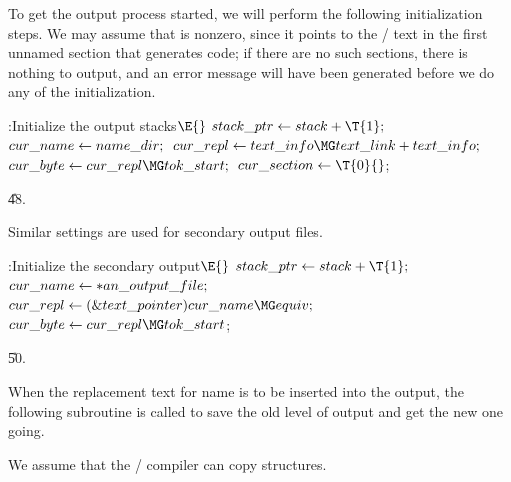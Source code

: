 To get the output process started, we will perform the following
initialization steps. We may assume that 
is nonzero,
since it points to the \CEE/ text in the first unnamed section that generates
code; if there are no such sections, there is nothing to output, and an
error message will have been generated before we do any of the initialization.

\Y\B\4:Initialize the output stacks\X${}\E{}$\6
$\\{stack\_ptr}\K\\{stack}+\T{1};{}$\6
${}\\{cur\_name}\leftarrow\\{name\_dir};{}$\6
${}\\{cur\_repl}\K\\{text\_info}\MG\\{text\_link}+\\{text\_info};{}$\6
${}\\{cur\_byte}\K\\{cur\_repl}\MG\\{tok\_start};{}$\6
${}\\{cur\_section}\K\T{0}{}$;\par
\U48.\fi

Similar settings are used for secondary output files.

\Y\B\4:Initialize the secondary output\X${}\E{}$\6
$\\{stack\_ptr}\K\\{stack}+\T{1};{}$\6
${}\\{cur\_name}\leftarrow{*}\\{an\_output\_file};{}$\6
${}\\{cur\_repl}\K(\&{text\_pointer})\,\\{cur\_name}\MG\\{equiv};{}$\6
${}\\{cur\_byte}\K\\{cur\_repl}\MG\\{tok\_start}{}$;\par
\U50.\fi

When the replacement text for name  is to be inserted into the
output,
the following subroutine is called to save the old level of output and get
the new one going.

We assume that the \CEE/ compiler can copy structures.

